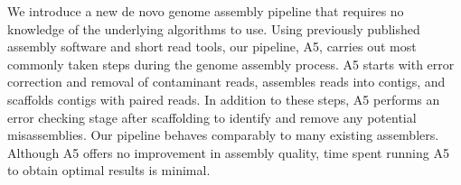 \documentclass{bioinfo}
\begin{document}
We introduce a new de novo genome assembly pipeline that requires no knowledge
of the underlying algorithms to use. Using previously 
published assembly software and short read tools, our pipeline, A5, carries out
most commonly taken steps during the genome assembly process. A5 starts with error correction
and removal of contaminant reads, assembles reads into contigs, and scaffolds
contigs with paired reads. In addition to these steps, A5 performs an 
error checking stage after scaffolding to identify and remove any potential misassemblies. 
Our pipeline behaves comparably to many existing assemblers. Although A5 offers no improvement
in assembly quality, time spent running A5 to obtain optimal results is minimal. 

\end{document}
